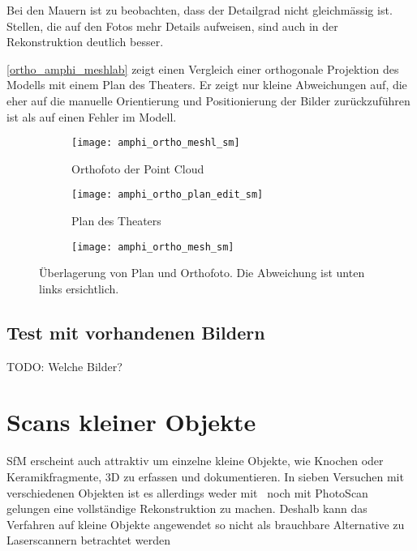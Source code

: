 				Bei den Mauern ist zu beobachten, dass der Detailgrad nicht gleichmässig ist. Stellen, die auf den Fotos mehr Details aufweisen, sind auch in der Rekonstruktion deutlich besser.
				
				\autoref{ortho_amphi_meshlab} zeigt einen Vergleich einer orthogonale Projektion des Modells mit einem Plan des Theaters. Er zeigt nur kleine Abweichungen auf, die eher auf die manuelle Orientierung und Positionierung der Bilder zurückzuführen ist als auf einen Fehler im Modell.
				\begin{figure}
					\begin{subfigure}{0.4\textwidth}
						\texttt{[image: amphi\_ortho\_meshl\_sm]}
						\caption{Orthofoto der Point Cloud}
					\end{subfigure}	
					\begin{subfigure}{0.4\textwidth}
						\texttt{[image: amphi\_ortho\_plan\_edit\_sm]}
						\caption{Plan des Theaters}
					\end{subfigure}
					\begin{subfigure}{\textwidth}
						\texttt{[image: amphi\_ortho\_mesh\_sm]}
					\end{subfigure}
					\caption[Überlagerung von Plan und Orthofoto. Plan aus \cite{engehalb}]{Überlagerung von Plan und Orthofoto. Die Abweichung ist unten links ersichtlich.}
					\label{ortho_amphi_meshlab}
				\end{figure}
		\subsection{Test mit vorhandenen Bildern} \label{res:test_vorhandene_bilder}
			TODO: Welche Bilder?
			
	\section{Scans kleiner Objekte}
		SfM erscheint auch attraktiv um einzelne kleine Objekte, wie Knochen oder Keramikfragmente, 3D zu erfassen und dokumentieren. In sieben Versuchen mit verschiedenen Objekten ist es allerdings weder mit \dronarch\ noch mit PhotoScan gelungen eine vollständige Rekonstruktion zu machen. Deshalb kann das Verfahren auf kleine Objekte angewendet so nicht als brauchbare Alternative zu Laserscannern betrachtet werden
		